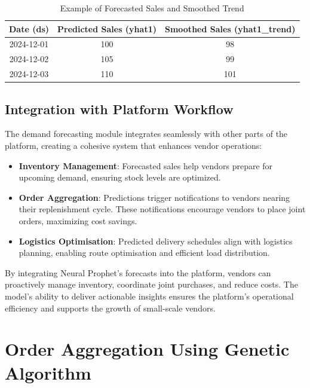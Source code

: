 \begin{table}[h!]
    \centering
    \begin{tabular}{|c|c|c|}
        \hline
        \textbf{Date (ds)} & \textbf{Predicted Sales (yhat1)} & \textbf{Smoothed Sales (yhat1\_trend)} \\
        \hline
        2024-12-01         & 100                              & 98                                     \\
        2024-12-02         & 105                              & 99                                     \\
        2024-12-03         & 110                              & 101                                    \\
        \hline
    \end{tabular}
    \caption{Example of Forecasted Sales and Smoothed Trend}
\end{table}

\subsection{Integration with Platform Workflow}

The demand forecasting module integrates seamlessly with other parts of the platform, creating a cohesive system that enhances vendor operations:

\begin{itemize}
    \item \textbf{Inventory Management}: Forecasted sales help vendors prepare for upcoming demand, ensuring stock levels are optimized.
    \item \textbf{Order Aggregation}: Predictions trigger notifications to vendors nearing their replenishment cycle. These notifications encourage vendors to place joint orders, maximizing cost savings.
    \item \textbf{Logistics Optimisation}: Predicted delivery schedules align with logistics planning, enabling route optimisation and efficient load distribution.
\end{itemize}

By integrating Neural Prophet’s forecasts into the platform, vendors can proactively manage inventory, coordinate joint purchases, and reduce costs. The model’s ability to deliver actionable insights ensures the platform’s operational efficiency and supports the growth of small-scale vendors.

\section{Order Aggregation Using Genetic Algorithm}


